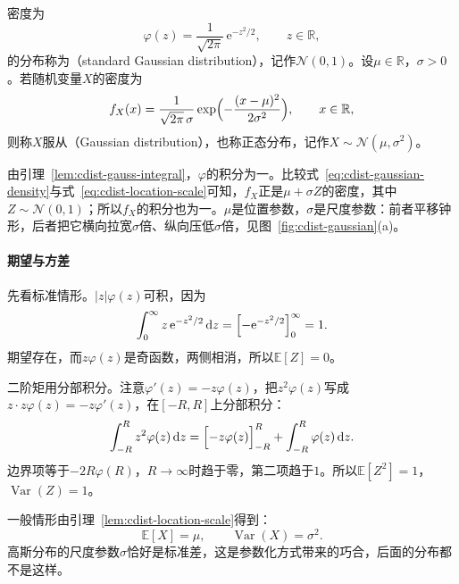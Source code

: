 \begin{definition}[高斯分布]
\label{def:cdist-gaussian}
密度为
\begin{equation}
  \varphi(z)=\frac{1}{\sqrt{2\pi}}\,\mathrm{e}^{-z^{2}/2},\qquad z\in\mathbb{R},
  \label{eq:cdist-standard-gaussian}
\end{equation}
的分布称为（standard Gaussian distribution），记作$\mathcal{N}(0,1)$。设$\mu\in\mathbb{R}$，$\sigma>0$。若随机变量$X$的密度为
\begin{equation}
  f_X(x)=\frac{1}{\sqrt{2\pi}\,\sigma}\exp\Bigl(-\frac{(x-\mu)^{2}}{2\sigma^{2}}\Bigr),\qquad x\in\mathbb{R},
  \label{eq:cdist-gaussian-density}
\end{equation}
则称$X$服从（Gaussian distribution），也称正态分布，记作$X\sim\mathcal{N}(\mu,\sigma^{2})$。
\end{definition}

由引理~\ref{lem:cdist-gauss-integral}，$\varphi$的积分为一。比较式~\eqref{eq:cdist-gaussian-density}与式~\eqref{eq:cdist-location-scale}可知，$f_X$正是$\mu+\sigma Z$的密度，其中$Z\sim\mathcal{N}(0,1)$；所以$f_X$的积分也为一。$\mu$是位置参数，$\sigma$是尺度参数：前者平移钟形，后者把它横向拉宽$\sigma$倍、纵向压低$\sigma$倍，见图~\ref{fig:cdist-gaussian}(a)。

\paragraph{期望与方差}
先看标准情形。$\lvert z\rvert\varphi(z)$可积，因为
\[
  \int_0^{\infty}z\,\mathrm{e}^{-z^{2}/2}\,\mathrm{d}z=\Bigl[-\mathrm{e}^{-z^{2}/2}\Bigr]_0^{\infty}=1 .
\]
期望存在，而$z\varphi(z)$是奇函数，两侧相消，所以$\mathbb{E}[Z]=0$。

二阶矩用分部积分。注意$\varphi'(z)=-z\varphi(z)$，把$z^{2}\varphi(z)$写成$z\cdot z\varphi(z)=-z\varphi'(z)$，在$[-R,R]$上分部积分：
\[
  \int_{-R}^{R}z^{2}\varphi(z)\,\mathrm{d}z=\Bigl[-z\varphi(z)\Bigr]_{-R}^{R}+\int_{-R}^{R}\varphi(z)\,\mathrm{d}z .
\]
边界项等于$-2R\varphi(R)$，$R\to\infty$时趋于零，第二项趋于$1$。所以$\mathbb{E}[Z^{2}]=1$，$\operatorname{Var}(Z)=1$。

一般情形由引理~\ref{lem:cdist-location-scale}得到：
\begin{equation}
  \mathbb{E}[X]=\mu,\qquad \operatorname{Var}(X)=\sigma^{2}.
  \label{eq:cdist-gaussian-moments}
\end{equation}
高斯分布的尺度参数$\sigma$恰好是标准差，这是参数化方式带来的巧合，后面的分布都不是这样。

